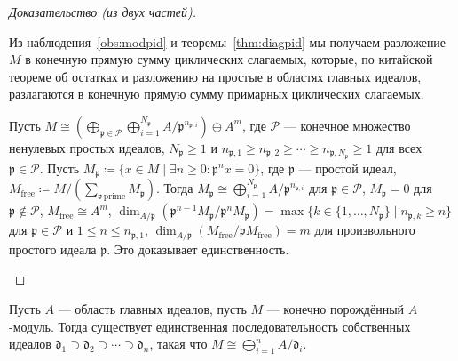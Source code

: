 \documentclass[
	extrafontsizes,
	11pt,
	hyphens,
]{memoir}
\begin{document}
\begin{proof}[Доказательство (из двух частей)]
~\begin{proofdescription}

\item[Доказательство существования.]
Из наблюдения~\ref{obs:modpid} и теоремы~\ref{thm:diagpid} мы получаем разложение \(M\) в конечную прямую сумму циклических слагаемых, которые, по китайской теореме об остатках и разложению на простые в областях главных идеалов, разлагаются в конечную прямую сумму примарных циклических слагаемых.

\item[Доказательство единственности.]
Пусть
\(
M \cong (\bigoplus_{\mathfrak{p} \in \mathcal{P}} \bigoplus_{i = 1}^{N_\mathfrak{p}} A/{\mathfrak{p}}^{n_{\mathfrak{p},i}}) \oplus A^m
\),
где \(\mathcal{P}\) --- конечное множество ненулевых простых идеалов,
\(N_\mathfrak{p} \geq 1\) и \(n_{\mathfrak{p},1} \geq n_{\mathfrak{p},2} \geq \cdots \geq n_{\mathfrak{p},N_\mathfrak{p}} \geq 1\) для всех \(\mathfrak{p} \in \mathcal{P}\).
Пусть \(M_\mathfrak{p} \coloneqq \{x \in M \mid \exists n \geq 0 : \mathfrak{p}^n x = 0\}\), где \(\mathfrak{p}\) --- простой идеал, \(M_\mathrm{free} \coloneqq M / (\sum_{\mathfrak{p}\, \text{prime}} M_\mathfrak{p})\).
Тогда \(M_\mathfrak{p} \cong \bigoplus_{i = 1}^{N_\mathfrak{p}} A/\mathfrak{p}^{n_{\mathfrak{p},i}}\) для \(\mathfrak{p} \in \mathcal{P}\), \(M_\mathfrak{p} = 0\) для \(\mathfrak{p} \notin \mathcal{P}\), \(M_\mathrm{free} \cong A^m\), \(\dim_{A/\mathfrak{p}}(\mathfrak{p}^{n-1}M_\mathfrak{p} / \mathfrak{p}^n M_\mathfrak{p}) = \max\{k \in \{1,\dots{},N_\mathfrak{p}\} \mid n_{\mathfrak{p},k} \geq n\}\) для \(\mathfrak{p} \in \mathcal{P}\) и \(1 \leq n \leq n_{\mathfrak{p},1}\), \(\dim_{A/\mathfrak{p}}(M_\mathrm{free}/\mathfrak{p}M_\mathrm{free}) = m\) для произвольного простого идеала \(\mathfrak{p}\). Это доказывает единственность.
\qedhere

\end{proofdescription}
\end{proof}

\begin{corollary}
Пусть \(A\) --- область главных идеалов, пусть \(M\) --- конечно порождённый \(A\)-модуль. Тогда существует единственная последовательность собственных идеалов \(\mathfrak{d}_1 \supset \mathfrak{d}_2 \supset \cdots{} \supset \mathfrak{d}_n\), такая что \(M \cong \bigoplus_{i=1}^n A / \mathfrak{d}_i\).
\end{corollary}
\end{document}

